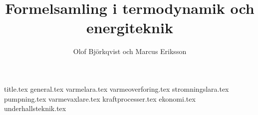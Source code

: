 \documentclass[a4paper,11pt,onecolumn,fleqn]{report}
\author{Olof Björkqvist och Marcus Eriksson}
\title{Formelsamling i termodynamik och energiteknik}
\begin{document}
{title.tex}
\tableofcontents
\setlength\LTleft{0 cm}
{general.tex}
{varmelara.tex}
{varmeoverforing.tex}
{stromningslara.tex}
{pumpning.tex}
{varmevaxlare.tex}
{kraftprocesser.tex}
{ekonomi.tex}
{underhallsteknik.tex}
\cleardoublepage
\printglossary[title=Symboler, toctitle=Symboler, type=\acronymtype]
\cleardoublepage
{}
\printbibliography
\end{document}
